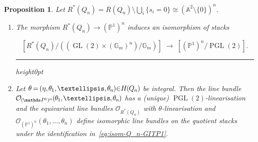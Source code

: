 \documentclass[10pt,a4paper]{amsart}
\newtheorem{prop}[theo]{Proposition}
\theoremstyle{definition}
\def\A{\mathds A}
\def\G{\mathds G}
\def\P{\mathds P}
\def\O{\mathcal O}
\newenvironment{equationi}{\par\noindent\vspace*{\abovedisplayskip}\begin{minipage}{\linewidth}
\begin{equation}}{\end{equation}\end{minipage}\hrule height0pt\leavevmode}
\DeclareMathOperator{\GL}{GL}
\DeclareMathOperator{\PGL}{PGL}
\newcommand*{\mk}{\mkern -1mu}
\newcommand*{\Mk}{\mkern -2mu}
\begin{document}
\begin{prop}\label{prop:Q_n-GITP1}
Let $R^*(Q_n)=R(Q_n)\setminus\bigcup_i\{s_i=0\}\cong(\A^2\setminus\{0\})^n$. %



\begin{enumerate}[label=(\alph*)]
\item\label{prop2.9_a}
The morphism $R^*(Q_n)\to(\P^1)^n$ induces an isomorphism of stacks
\begin{equationi}\label{eq:isom-Q_n-GITP1}
[R^*(Q_n)/((\GL(2)\times(\G_m)^n)/\G_m)]\;\to\;[(\P^1)^n/\PGL(2)].
\end{equationi}

\item\label{prop2.9_b}
Let $\theta \Mk = \Mk (\eta,\mk \theta_{\mk 1},\mk \ldots,\mk \theta_{\mk n}\mk )\Mk \! \in\Mk \!H\mk (\mk Q_{\mk n}\mk )\mk $ be integral. 
Then the line bundle %
$\mk \O_{\mk (\mk \P^{\mk 1}\mk )^{\mk n}}\mk (\mk \theta_{\mk 1}\mk ,\mk \ldots\mk ,\mk \theta_{\mk n}\mk )$ has a 
(unique) $\PGL(2)$-linearisation and the equivariant line bundles $\O_{R^*(Q_n)}$ with 
$\theta$-linearisation and $\O_{(\P^1)^n}(\theta_1,\ldots,\theta_n)$ define 
isomorphic line bundles on the quotient stacks under the identification 
in~\eqref{eq:isom-Q_n-GITP1}.
\end{enumerate}
\end{prop}
\end{document}
